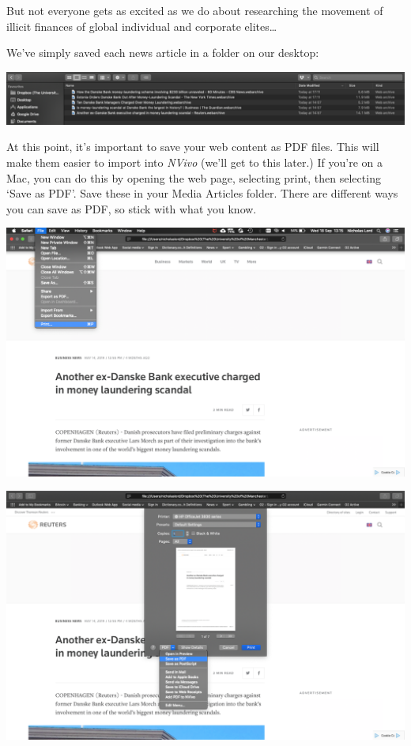 \documentclass[
]{book}
\begin{document}
But not everyone gets as excited as we do about researching the movement of illicit finances of global individual and corporate elites\ldots{}

We've simply saved each news article in a folder on our desktop:

\includegraphics{imgs/dankse_folder.png}

At this point, it's important to save your web content as PDF files. This will make them easier to import into \emph{NVivo} (we'll get to this later.) If you're on a Mac, you can do this by opening the web page, selecting print, then selecting `Save as PDF'. Save these in your Media Articles folder. There are different ways you can save as PDF, so stick with what you know.

\includegraphics{imgs/mac_news_1.png}

\includegraphics{imgs/mac_news_2.png}
\end{document}
